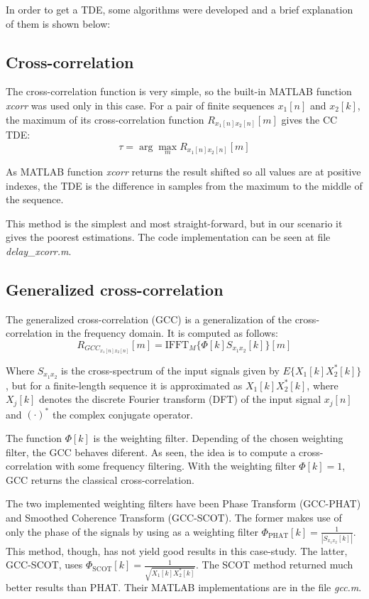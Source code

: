 In order to get a TDE, some algorithms were developed and a brief explanation of them is shown below:

\subsection{Cross-correlation}
  The cross-correlation function is very simple, so the built-in MATLAB function \emph{xcorr} was used only in this case. For a pair of finite sequences $x_1[n]$ and $x_2[k]$, the maximum of its cross-correlation function $R_{x_1[n] x_2[n]}[m]$ gives the CC TDE:
  \begin{dmath}
    \tau = \arg\max_m R_{x_1[n] x_2[n]}[m]
  \end{dmath}
  
  As MATLAB function \emph{xcorr} returns the result shifted so all values are at positive indexes, the TDE is the difference in samples from the maximum to the middle of the sequence.
  
  This method is the simplest and most straight-forward, but in our scenario it gives the poorest estimations. The code implementation can be seen at file \emph{delay\_xcorr.m}\cite{delayxcorr.m}.
  

\subsection{Generalized cross-correlation}
The generalized cross-correlation (GCC) is a generalization of the cross-correlation in the frequency domain. It is computed as follows:
\begin{dmath}
  R_{GCC_{x_1[n] x_2[n]}}[m] = \text{IFFT}_M\{\Phi[k]S_{x_1x_2}[k]\}[m]
\end{dmath}

Where $S_{x_1x_2}$ is the cross-spectrum of the input signals given by $E\{X_1[k]X^*_2[k]\} $, but for a finite-length sequence it is approximated as $X_1[k]X^*_2[k]$, where $X_j[k]$ denotes the discrete Fourier transform (DFT) of the input signal $x_j[n]$ and $(\cdotp)^*$ the complex conjugate operator.

The function $\Phi[k]$ is the weighting filter. Depending of the chosen weighting filter, the GCC behaves diferent. As seen, the idea is to compute a cross-correlation with some frequency filtering. With the weighting filter $\Phi[k]=1$, GCC returns the classical cross-correlation.

The two implemented weighting filters have been Phase Transform (GCC-PHAT) and Smoothed Coherence Transform (GCC-SCOT). The former makes use of only the phase of the signals by using as a weighting filter $\Phi_{\text{PHAT}}[k]=\frac{1}{|S_{x_1x_2}[k]|}$. This method, though, has not yield good results in this case-study. The latter, GCC-SCOT, uses $\Phi_{\text{SCOT}}[k]=\frac{1}{\sqrt{X_1[k]X^*_2[k]}}$. The SCOT method returned much better results than PHAT. Their MATLAB implementations are in the file \emph{gcc.m}\cite{gcc.m}.

